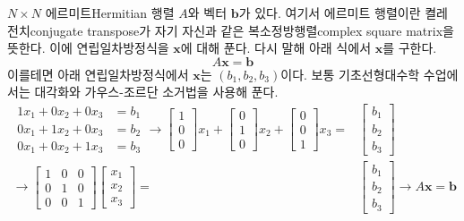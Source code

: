 \documentclass[a4paper,atbegshi,chapter,itemph,hidelinks]{oblivoir}
\begin{document}
$N\times N$ 에르미트{\footnotesize Hermitian} 행렬 $A$와 벡터 $\mathbf{b}$가 
있다. 여기서 에르미트 행렬이란 켤레전치{\footnotesize conjugate transpose}가
자기 자신과 같은 복소정방행렬{\footnotesize complex square matrix}을 뜻한다. 이에 
연립일차방정식을 $\mathbf{x}$에 대해 푼다. 다시 말해 아래 식에서
$\mathbf{x}$를 구한다.
\[
  A\mathbf{x}=\mathbf{b}
\]
이를테면 아래 연립일차방정식에서 $\mathbf{x}$는 $(b_1,b_2,b_3)$이다. 보통
기초선형대수학 수업에서는 대각화와 가우스-조르단 소거법을 사용해 푼다.
\begin{align*}
  \begin{matrix}
  1x_1+0x_2+0x_3 &= b_1 \\
  0x_1+1x_2+0x_3 &= b_2\\
  0x_1+0x_2+1x_3 &= b_3
\end{matrix}\longrightarrow
\begin{bmatrix}
  1\\0\\0
\end{bmatrix}x_1+
\begin{bmatrix}
  0\\1\\0
\end{bmatrix}x_2+
\begin{bmatrix}
  0\\0\\1
\end{bmatrix}x_3=&
\begin{bmatrix}
  b_1\\b_2\\b_3
\end{bmatrix}
  \\\longrightarrow
\begin{bmatrix}
  1&0&0\\0&1&0\\0&0&1
\end{bmatrix}
\begin{bmatrix}x_1\\x_2\\x_3\end{bmatrix}
  =&\begin{bmatrix}b_1\\b_2\\b_3\end{bmatrix}\longrightarrow
  A\mathbf{x}=\mathbf{b}
\end{align*}
\end{document}
